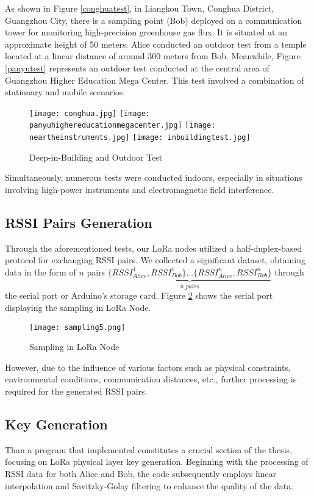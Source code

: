 As shown in Figure \ref{conghuatest}, in Liangkou Town, Conghua District, Guangzhou City, there is a sampling point (Bob) deployed on a communication tower for monitoring high-precision greenhouse gas flux. It is situated at an approximate height of 50 meters. Alice conducted an outdoor test from a temple located at a linear distance of around 300 meters from Bob.
Meanwhile, Figure \ref{panyutest} represents an outdoor test conducted at the central area of Guangzhou Higher Education Mega Center. This test involved a combination of stationary and mobile scenarios.
\begin{figure}
  \centering
  {\texttt{[image: conghua.jpg]}}
  {\texttt{[image: panyuhighereducationmegacenter.jpg]}}
  {\texttt{[image: neartheinstruments.jpg]}}
  {\texttt{[image: inbuildingtest.jpg]}}
  \caption{Deep-in-Building and Outdoor Test}\label{Test}
\end{figure}

Simultaneously, numerous tests were conducted indoors, especially in situations involving high-power instruments and electromagnetic field interference.
\subsection{RSSI Pairs Generation}
Through the aforementioned tests, our LoRa nodes utilized a half-duplex-based protocol for exchanging RSSI pairs. We collected a significant dataset, obtaining data in the form of \(n\) pairs \(\underbrace{\{RSSI_{Alice}^1, RSSI_{Bob}^1\}...\{RSSI_{Alice}^n, RSSI_{Bob}^n\}}_{n\_pairs}\) through the serial port or Arduino's storage card. Figure \ref{sampling5} shows the serial port displaying the sampling in LoRa Node.
\begin{figure}
  \centering
  \texttt{[image: sampling5.png]}
  \caption{Sampling in LoRa Node}
  \label{sampling5}
\end{figure}

However, due to the influence of various factors such as physical constraints, environmental conditions, communication distances, etc., further processing is required for the generated RSSI pairs.

\subsection{Key Generation}
Than a program that implemented constitutes a crucial section of the thesis, focusing on LoRa physical layer key generation. Beginning with the processing of RSSI data for both Alice and Bob, the code subsequently employs linear interpolation and Savitzky-Golay filtering to enhance the quality of the data.

